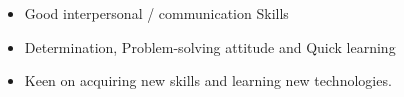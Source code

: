 %
%
%

\twocolumnsection   
{
\begin{skills}
\end{skills}}
{
\vspace{0.5em}
\begin{itemize}
    \item Good interpersonal / communication Skills
    \item Determination, Problem-solving attitude and Quick learning
    \item Keen on acquiring new skills and learning new technologies.
\end{itemize}
}
